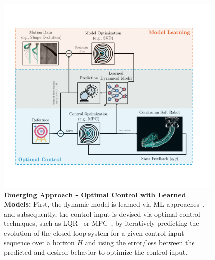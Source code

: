 \begin{figure}[ht]
    \centering
    \includegraphics[width=0.9\linewidth]{introduction/figures/optimal_control_learned_models_v1_cropped.pdf}
    \caption{\textbf{Emerging Approach - Optimal Control with Learned Models:} 
    First, the dynamic model is learned via \gls{ML} approaches~\citep{gillespie2018learning, xie2023dynamic, alora2023data, alora2023robust, kasaei2023data, liu2024physics, chen2024data, marques2024visuo}, and subsequently, the control input is devised via optimal control techniques, such as \gls{LQR}~\citep{bruder2020data, bruder2024koopman} or \gls{MPC}~\citep{gillespie2018learning, hewing2020learning, alora2023data, alora2023robust}, by iteratively predicting the evolution of the closed-loop system for a given control input sequence over a horizon $H$ and using the error/loss between the predicted and desired behavior to optimize the control input.
    }
    \label{fig:introduction:optimal_control_with_learned_models}
\end{figure}

